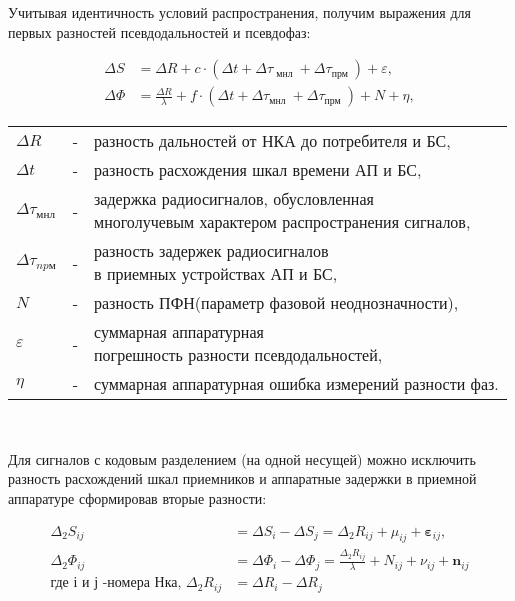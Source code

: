 \documentclass[14pt,a4paper,oneside]{extarticle}
\begin{document}
Учитывая идентичность условий распространения, получим выражения для первых разностей псевдодальностей и псевдофаз:

\[\begin{aligned}\Delta S&=\Delta R+c\cdot(\Delta t+\Delta\tau_\text{ мнл }+\Delta\tau_\text{прм })+\varepsilon,\\\Delta\Phi&=\frac{\Delta R}{\lambda}+f\cdot(\Delta t+\Delta\tau_\text{мнл }+\Delta\tau_\text{прм })+N+\eta,\end{aligned}\]

\begin{tabular}{ l c l }
    $\Delta R$                & - & разность дальностей от НКА до потребителя и БС,       \\
    $\Delta t$                & - & разность расхождения шкал времени АП и БС,            \\
    $\Delta \tau_\text{мнл}$  & - & \makecell[l]{задержка радиосигналов, обусловленная    \\ многолучевым характером распространения сигналов,} \\
    $\Delta\tau_{np\text{м}}$ & - & \makecell[l]{разность задержек радиосигналов          \\ в приемных устройствах АП и БС,} \\
    $N$                       & - & разность ПФН(параметр фазовой неоднозначности),       \\
    $\varepsilon$             & - & \makecell[l]{суммарная аппаратурная                   \\ погрешность разности псевдодальностей,} \\
    $\eta $                   & - & суммарная аппаратурная ошибка измерений разности фаз. \\
\end{tabular}

\

Для сигналов с кодовым разделением (на одной несущей) можно исключить разность расхождений шкал приемников и аппаратные задержки в приемной аппаратуре сформировав вторые разности:

\[\begin{aligned}\Delta_2S_{ij}&=\Delta S_i-\Delta S_j=\Delta_2R_{ij}+\mu_{ij}+\boldsymbol{\varepsilon}_{ij},\\\Delta_2\Phi_{ij}&=\Delta\Phi_i-\Delta\Phi_j=\frac{\Delta_2R_{ij}}\lambda+N_{ij}+\nu_{ij}+\boldsymbol{n}_{ij}\\\text{где і и ј -номера Нка, }\Delta_2R_{ij}&=\Delta R_i-\Delta R_j\end{aligned}\]
\end{document}
